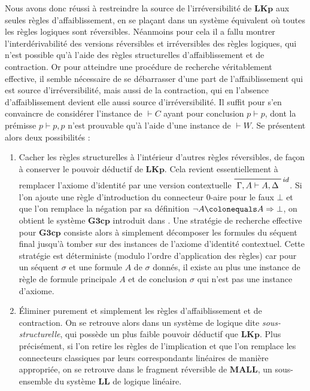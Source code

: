 \documentclass[11pt]{report}
\newcommand{\lto}{\Rightarrow}
\newcommand{\seq}{\vdash}
\newcommand{\irule}[1]{\footnotesize$#1$}
\newcommand{\iruleR}[1]{\irule{\seq{#1}}}
\begin{document}
Nous avons donc réussi à restreindre la source de l'irréversibilité de $\mathbf{LKp}$ aux seules règles d'affaiblissement, en se plaçant dans un système équivalent où toutes les règles logiques sont réversibles. Néanmoins pour cela il a fallu montrer l'interdérivabilité des versions réversibles et irréversibles des règles logiques, qui n'est possible qu'à l'aide des règles structurelles d'affaiblissement et de contraction. Or pour atteindre une procédure de recherche véritablement effective, il semble nécessaire de se débarrasser d'une part de l'affaiblissement qui est source d'irréversibilité, mais aussi de la contraction, qui en l'absence d'affaiblissement devient elle aussi source d'irréversibilité. Il suffit pour s'en convaincre de considérer l'instance de {\iruleR{C}} ayant pour conclusion $p \seq p$, dont la prémisse $p \seq p,p$ n'est prouvable qu'à l'aide d'une instance de {\iruleR{W}}. Se présentent alors deux possibilités :
\begin{enumerate}
	\item Cacher les règles structurelles à l'intérieur d'autres règles réversibles, de façon à conserver le pouvoir déductif de $\mathbf{LKp}$. Cela revient essentiellement à remplacer l'axiome d'identité par une version contextuelle $\prfbyaxiom{\irule{id}}{\Gamma,A \seq A,\Delta}$. Si l'on ajoute une règle d'introduction du connecteur 0-aire pour le faux $\bot$ et que l'on remplace la négation par sa définition $\neg A \colonequals A \lto \bot$, on obtient le système $\mathbf{G3cp}$ introduit dans \cite{vPN01}. Une stratégie de recherche effective pour $\mathbf{G3cp}$ consiste alors à simplement décomposer les formules du séquent final jusqu'à tomber sur des instances de l'axiome d'identité contextuel. Cette stratégie est déterministe (modulo l'ordre d'application des règles) car pour un séquent $\sigma$ et une formule $A$ de $\sigma$ donnés, il existe au plus une instance de règle de formule principale $A$ et de conclusion $\sigma$ qui n'est pas une instance d'axiome.
    \item Éliminer purement et simplement les règles d'affaiblissement et de contraction. On se retrouve alors dans un système de logique dite \emph{sous-structurelle}, qui possède un plus faible pouvoir déductif que $\mathbf{LKp}$. Plus précisément, si l'on retire les règles de l'implication et que l'on remplace les connecteurs classiques par leurs correspondants linéaires de manière appropriée, on se retrouve dans le fragment réversible de $\mathbf{MALL}$, un sous-ensemble du système $\mathbf{LL}$ de logique linéaire.
\end{enumerate}
\end{document}
